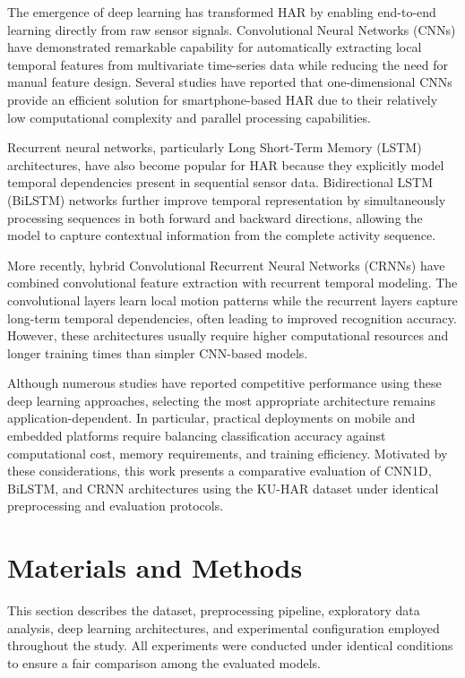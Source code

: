 \documentclass[journal]{IEEEtran}
\begin{document}
The emergence of deep learning has transformed HAR by enabling end-to-end learning directly from raw sensor signals. Convolutional Neural Networks (CNNs) have demonstrated remarkable capability for automatically extracting local temporal features from multivariate time-series data while reducing the need for manual feature design. Several studies have reported that one-dimensional CNNs provide an efficient solution for smartphone-based HAR due to their relatively low computational complexity and parallel processing capabilities.

Recurrent neural networks, particularly Long Short-Term Memory (LSTM) architectures, have also become popular for HAR because they explicitly model temporal dependencies present in sequential sensor data. Bidirectional LSTM (BiLSTM) networks further improve temporal representation by simultaneously processing sequences in both forward and backward directions, allowing the model to capture contextual information from the complete activity sequence.

More recently, hybrid Convolutional Recurrent Neural Networks (CRNNs) have combined convolutional feature extraction with recurrent temporal modeling. The convolutional layers learn local motion patterns while the recurrent layers capture long-term temporal dependencies, often leading to improved recognition accuracy. However, these architectures usually require higher computational resources and longer training times than simpler CNN-based models.

Although numerous studies have reported competitive performance using these deep learning approaches, selecting the most appropriate architecture remains application-dependent. In particular, practical deployments on mobile and embedded platforms require balancing classification accuracy against computational cost, memory requirements, and training efficiency. Motivated by these considerations, this work presents a comparative evaluation of CNN1D, BiLSTM, and CRNN architectures using the KU-HAR dataset under identical preprocessing and evaluation protocols.

\section{Materials and Methods}

This section describes the dataset, preprocessing pipeline, exploratory data analysis, deep learning architectures, and experimental configuration employed throughout the study. All experiments were conducted under identical conditions to ensure a fair comparison among the evaluated models.
\end{document}
